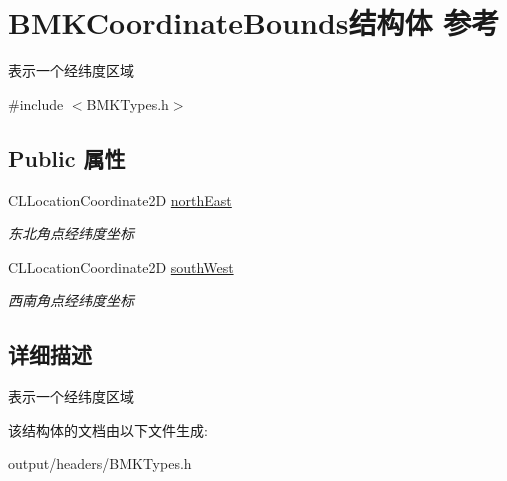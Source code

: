 \hypertarget{struct_b_m_k_coordinate_bounds}{}\section{B\+M\+K\+Coordinate\+Bounds结构体 参考}
\label{struct_b_m_k_coordinate_bounds}


表示一个经纬度区域  




{\ttfamily \#include $<$B\+M\+K\+Types.\+h$>$}

\subsection*{Public 属性}
\begin{DoxyCompactItemize}
\item 
\hypertarget{struct_b_m_k_coordinate_bounds_a0ebf42cb8682f2a6990fc7c6e439702e}{}C\+L\+Location\+Coordinate2\+D \hyperlink{struct_b_m_k_coordinate_bounds_a0ebf42cb8682f2a6990fc7c6e439702e}{north\+East}\label{struct_b_m_k_coordinate_bounds_a0ebf42cb8682f2a6990fc7c6e439702e}

\begin{DoxyCompactList}\small\item\em 东北角点经纬度坐标 \end{DoxyCompactList}\item 
\hypertarget{struct_b_m_k_coordinate_bounds_afd02c24b2ffe5aba18a125a48cdd1c37}{}C\+L\+Location\+Coordinate2\+D \hyperlink{struct_b_m_k_coordinate_bounds_afd02c24b2ffe5aba18a125a48cdd1c37}{south\+West}\label{struct_b_m_k_coordinate_bounds_afd02c24b2ffe5aba18a125a48cdd1c37}

\begin{DoxyCompactList}\small\item\em 西南角点经纬度坐标 \end{DoxyCompactList}\end{DoxyCompactItemize}


\subsection{详细描述}
表示一个经纬度区域 

该结构体的文档由以下文件生成\+:\begin{DoxyCompactItemize}
\item 
output/headers/B\+M\+K\+Types.\+h\end{DoxyCompactItemize}
